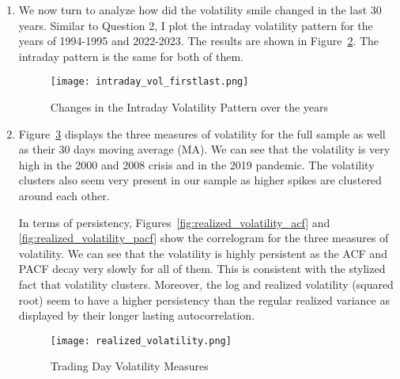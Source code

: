 \begin{solution}
\begin{enumerate}[label = \arabic*)]
    The results are shown in Figure~\ref{fig:volatility_smile}. We can see that the volatility is higher in the first and last hours of the day, and lower in the middle of the day. This is consistent with the volatility smile stylized fact. Moreover, they seem to exhibit some seasonality, with the volatility spiking up at every 30 minutes. 

    \begin{figure}[!htbp]
        \centering
        \caption{Intraday Volatility Pattern}
        \label{fig:volatility_smile}
        \texttt{[image: intraday\_vol.png]}
    \end{figure}

    \item We now turn to analyze how did the volatility smile changed in the last 30 years. Similar to Question 2, I plot the intraday volatility pattern for the years of 1994-1995 and 2022-2023. The results are shown in Figure~\ref{fig:volatility_smile_firstlast}. The intraday pattern is the same for both of them. 
    
    \begin{figure}[!htbp]
        \centering
        \caption{Changes in the Intraday Volatility Pattern over the years}
        \label{fig:volatility_smile_firstlast}
        \texttt{[image: intraday\_vol\_firstlast.png]}
    \end{figure}

    \item Figure~\ref{fig:realized_volatility} displays the three measures of volatility for the full sample as well as their 30 days moving average (MA). We can see that the volatility is very high in the 2000 and 2008 crisis and in the 2019 pandemic. The volatility clusters also seem very present in our sample as higher spikes are clustered around each other. 

    In terms of persistency, Figures~\ref{fig:realized_volatility_acf} and \ref{fig:realized_volatility_pacf} show the correlogram for the three measures of volatility. We can see that the volatility is highly persistent as the ACF and PACF decay very slowly for all of them. This is consistent with the stylized fact that volatility clusters. Moreover, the log and realized volatility (squared root) seem to have a higher persistency than the regular realized variance as displayed by their longer lasting autocorrelation.
    
    \begin{figure}[!htbp]
        \centering
        \caption{Trading Day Volatility Measures}
        \label{fig:realized_volatility}
        \texttt{[image: realized\_volatility.png]}
    \end{figure}
    

\end{enumerate}
\end{solution}
